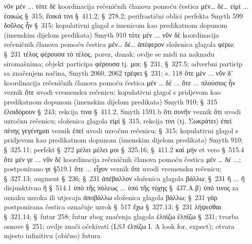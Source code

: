 \begin{description}[noitemsep]
νῦν μέν ... τότε δὲ	koordinacija rečeničnih članova pomoću čestica μέν… δέ…
εἰμί ... ἐοικώς	§~315; ἔοικά τινι §~411.2; §~278.2; perifrastični oblici perfekta Smyth 599
δοῦλος ἦν	§~315; kopulativni glagol s imenicom kao predikatnom dopunom
(imenskim dijelom predikata) Smyth 910
τότε μέν ... νῦν δὲ 	koordinacija rečeničnih članova pomoću čestica μέν… δέ…
ἀπέφερον	složenica glagola φέρω; §~231
τέλος φέρουσα 
	τὸ τέλος, porez, danak; ovdje se misli na naknadu siromašnima; objekt participa φέρουσα tj. μοι; §~231, §~327.5; adverbni particip sa značenjem načina, Smyth 2060, 2062
τρέφει	§~231; s. 118
ὅτε μὲν ... νῦν δ' 	koordinacija rečeničnih članova pomoću čestica μέν … δέ ...
ὅτε ... πλούσιος ἦν	veznik ὅτε uvodi vremensku rečenicu; kopulativni glagol s pridjevom kao predikatnom dopunom (imenskim dijelom predikata) Smyth 910; §~315 
ἐλοιδόρουν	§~243; rekcija τινα §~411.2, Smyth 1591.b
ὅτι συνῆν 	veznik ὅτι uvodi uzročnu rečenicu; složenica glagola εἰμί §~315, rekcija τινι (tj. Σωκράτει)
ἐπεὶ πένης γεγένημαι	veznik ἐπεί uvodi uzročnu rečenicu; §~315; kopulativni glagol s pridjevom kao predikatnom dopunom (imenskim dijelom predikata) Smyth 910; §~325.11; perfekt §~272
μέλει	μέλει μοι §~325.16; §~411.2 
καὶ μήν 	et vero §~515.4
ὅτε μέν γε ... νῦν δέ	koordinacija rečeničnih članova pomoću čestica μέν … δέ ...; postponirano γε §519.1
ὅτε ... εἶχον 
	veznik ὅτε uvodi vremensku rečenicu; §~327.13; augment §~236; §~231 
ἀπέβαλλον	složenica glagola βάλλω; §~231
ἤ ... ἤ	disjunktivno ἤ §~514.1
ὑπὸ τῆς πόλεως ...  ὑπὸ τῆς τύχης	§~437.A.β) ὑπό τινος za oznaku uzroka ili utjecaja
ἀποβάλλω	složenica glagola βάλλω; §~231
γάρ	postponirana čestica označuje uzrok §~517
ἔχω	§~327.13; §~231
λήψεσθαι	§~321.14; §~futur 258; futur zbog značenja glagola ἐλπίζω
ἐλπίζω	§~231; tvorba osnove §~251; ovdje znači očekivati (LSJ ἐλπίζω I. A look for, expect); otvara mjesto infinitivu (obično) futura

\end{description}



